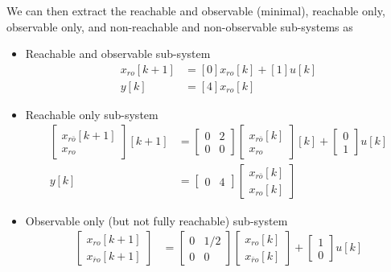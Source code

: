 \documentclass[twoside]{article}
\begin{document}
We can then extract the reachable and observable (minimal), reachable only,  observable only, and non-reachable and non-observable sub-systems as
\begin{itemize}
    \item Reachable and observable sub-system
    \begin{align*}
        x_{ro}[k+1] &= [0] x_{ro}[k] + [1] u[k]
        \\
        y[k] &= [4] x_{ro}[k]
    \end{align*}
    \item Reachable only sub-system
    \begin{align*}
        \begin{bmatrix} x_{r\bar{o}}[k+1] \\ x_{ro}\end{bmatrix}[k+1] &= 
        \left[ \begin{array}{c|c} 0 & 2 \\ \hline 
    0 & 0  \end{array} \right]
    \begin{bmatrix} x_{r\bar{o}}[k] \\ x_{ro}\end{bmatrix}[k] + \left[ \begin{array}{c} 0 \\ 1 \end{array} \right] u[k]
        \\
        y[k] &= \left[ \begin{array}{c|c} 0 & 4 \end{array} \right] \begin{bmatrix} x_{r\bar{o}}[k] \\ x_{ro}[k] \end{bmatrix}  
    \end{align*}
    \item Observable only (but not fully reachable) sub-system
    \begin{align*}
        \begin{bmatrix} x_{ro}[k+1] \\ x_{\bar{r}o}[k+1] \end{bmatrix} &= 
        \left[ \begin{array}{c|c} 0 & 1/2 \\ \hline 
    0 & 0  \end{array} \right]
    \begin{bmatrix} x_{ro}[k] \\ x_{\bar{r}o}[k] \end{bmatrix} + \left[ \begin{array}{c} 1 \\ 0 \end{array} \right] u[k]

\end{align*}
\end{itemize}
\end{document}
